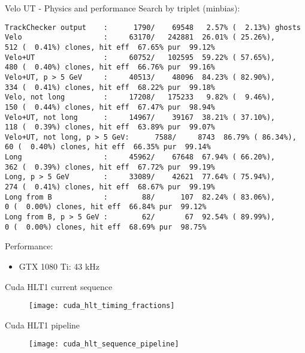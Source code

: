 \begin{frame}[fragile]{Velo UT - Physics and performance}
Search by triplet (minbias):
\begin{Verbatim}[fontsize=\tiny]
TrackChecker output    :      1790/    69548   2.57% (  2.13%) ghosts
Velo                   :     63170/   242881  26.01% ( 25.26%),       512 (  0.41%) clones, hit eff  67.65% pur  99.12%
Velo+UT                :     60752/   102595  59.22% ( 57.65%),       480 (  0.40%) clones, hit eff  66.76% pur  99.16%
Velo+UT, p > 5 GeV     :     40513/    48096  84.23% ( 82.90%),       334 (  0.41%) clones, hit eff  68.22% pur  99.18%
Velo, not long         :     17208/   175233   9.82% (  9.46%),       150 (  0.44%) clones, hit eff  67.47% pur  98.94%
Velo+UT, not long      :     14967/    39167  38.21% ( 37.10%),       118 (  0.39%) clones, hit eff  63.89% pur  99.07%
Velo+UT, not long, p > 5 GeV:      7588/     8743  86.79% ( 86.34%),        60 (  0.40%) clones, hit eff  66.35% pur  99.14%
Long                   :     45962/    67648  67.94% ( 66.20%),       362 (  0.39%) clones, hit eff  67.72% pur  99.19%
Long, p > 5 GeV        :     33089/    42621  77.64% ( 75.94%),       274 (  0.41%) clones, hit eff  68.67% pur  99.19%
Long from B            :        88/      107  82.24% ( 83.06%),         0 (  0.00%) clones, hit eff  66.84% pur  99.12%
Long from B, p > 5 GeV :        62/       67  92.54% ( 89.99%),         0 (  0.00%) clones, hit eff  68.69% pur  98.75%
\end{Verbatim}

Performance:
\begin{itemize}
\item GTX 1080 Ti: 43 kHz
\end{itemize}
\end{frame}

\begin{frame}{Cuda HLT1 current sequence}
\begin{figure}
\texttt{[image: cuda\_hlt\_timing\_fractions]}
\end{figure}
\end{frame}

\begin{frame}{Cuda HLT1 pipeline}
\begin{figure}
\texttt{[image: cuda\_hlt\_sequence\_pipeline]}
\end{figure}
\end{frame}

